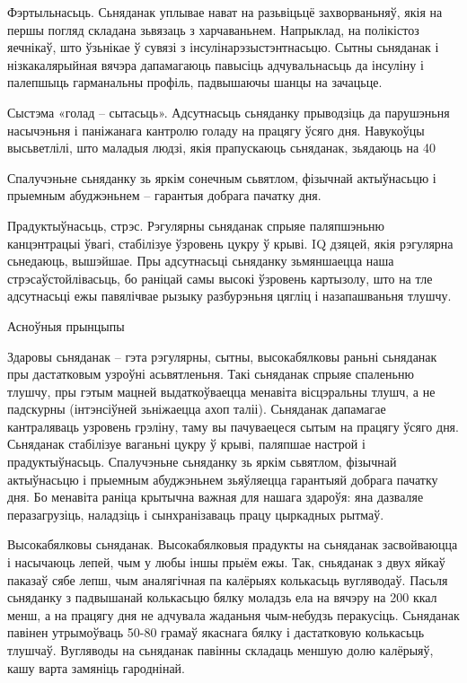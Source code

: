 Фэртыльнасьць.
Сьняданак уплывае нават на разьвіцьцё захворваньняў, якія на першы погляд складана зьвязаць з харчаваньнем. Напрыклад, на полікістоз яечнікаў, што ўзьнікае ў сувязі з інсулінарэзыстэнтнасьцю. Сытны сьняданак і нізкакалярыйная вячэра дапамагаюць павысіць адчувальнасьць да інсуліну і палепшыць гарманальны профіль, падвышаючы шанцы на зачацьце.

Сыстэма «голад – сытасьць».
Адсутнасьць сьняданку прыводзіць да парушэньня насычэньня і паніжанага кантролю голаду на працягу ўсяго дня. Навукоўцы высьветлілі, што маладыя людзі, якія прапускаюць сьняданак, зьядаюць на 40%

Спалучэньне сьняданку зь яркім сонечным сьвятлом, фізычнай актыўнасьцю і прыемным абуджэньнем – гарантыя добрага пачатку дня.

Прадуктыўнасьць, стрэс.
Рэгулярны сьняданак спрыяе паляпшэньню канцэнтрацыі ўвагі, стабілізуе ўзровень цукру ў крыві. IQ дзяцей, якія рэгулярна сьнедаюць, вышэйшае. Пры адсутнасьці сьняданку зьмяншаецца наша стрэсаўстойлівасьць, бо раніцай самы высокі ўзровень картызолу, што на тле адсутнасьці ежы павялічвае рызыку разбурэньня цягліц і назапашваньня тлушчу.

Асноўныя прынцыпы

Здаровы сьняданак – гэта рэгулярны, сытны, высокабялковы раньні сьняданак пры дастатковым узроўні асьвятленьня.
Такі сьняданак спрыяе спаленьню тлушчу, пры гэтым мацней выдаткоўваецца менавіта вісцэральны тлушч, а не падскурны (інтэнсіўней зьніжаецца ахоп таліі). Сьняданак дапамагае кантраляваць узровень грэліну, таму вы пачуваецеся сытым на працягу ўсяго дня. Сьняданак стабілізуе ваганьні цукру ў крыві, паляпшае настрой і прадуктыўнасьць. Спалучэньне сьняданку зь яркім сьвятлом, фізычнай актыўнасьцю і прыемным абуджэньнем зьяўляецца гарантыяй добрага пачатку дня. Бо менавіта раніца крытычна важная для нашага здароўя: яна дазваляе перазагрузіць, наладзіць і сынхранізаваць працу цыркадных рытмаў.

Высокабялковы сьняданак.
Высокабялковыя прадукты на сьняданак засвойваюцца і насычаюць лепей, чым у любы іншы прыём ежы. Так, сньяданак з двух яйкаў паказаў сябе лепш, чым аналягічная па калёрыях колькасьць вугляводаў. Пасьля сьняданку з падвышанай колькасьцю бялку моладзь ела на вячэру на 200 ккал менш, а на працягу дня не адчувала жаданьня чым-небудзь перакусіць. Сьняданак павінен утрымоўваць 50-80 грамаў якаснага бялку і дастатковую колькасьць тлушчаў. Вугляводы на сьняданак павінны складаць меншую долю калёрыяў, кашу варта замяніць гароднінай.

